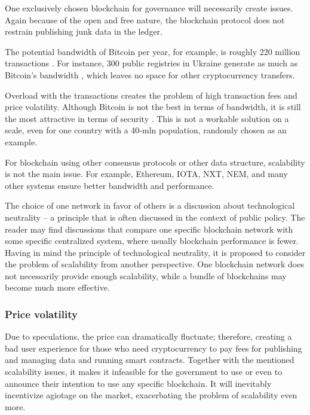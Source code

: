 \begin{multicols}{2}
\vspace{-.4cm}

One exclusively chosen blockchain for governance will necessarily create issues. Again because of the open and free nature, the blockchain protocol does not restrain publishing junk data in the ledger.

The potential bandwidth of Bitcoin per year, for example, is roughly 220 million transactions \cite{art1-key17}. For instance, 300 public registries in Ukraine generate as much as Bitcoin’s bandwidth \cite{art1-key18}, which leaves no space for other cryptocurrency transfers.

Overload with the transactions creates the problem of high transaction fees and price volatility. Although Bitcoin is not the best in terms of bandwidth, it is still the most attractive in terms of security \cite{art1-key19}. This is not a workable solution on a scale, even for one country with a 40-mln population, randomly chosen as an example.

For blockchain using other consensus protocols or other data structure, scalability is not the main issue. For example, Ethereum, IOTA, NXT, NEM, and many other systems ensure better bandwidth and performance.

The choice of one network in favor of others is a discussion about technological neutrality – a principle that is often discussed in the context of public policy. The reader may find discussions that compare one specific blockchain network with some specific centralized system, where usually blockchain performance is fewer. Having in mind the principle of technological neutrality, it is proposed to consider the problem of scalability from another perspective. One blockchain network does not necessarily provide enough scalability, while a bundle of blockchains may become much more effective.

\vspace{-.7cm}

\subsubsection{Price volatility}\label{subsubsec-03.1.6}

\vspace{-.4cm}

Due to speculations, the price can dramatically fluctuate; therefore, creating a bad user experience for those who need cryptocurrency to pay fees for publishing and managing data and running smart contracts. Together with the mentioned scalability issues, it makes it infeasible for the government to use or even to announce their intention to use any specific blockchain. It will inevitably incentivize agiotage on the market, exacerbating the problem of scalability even more.


\end{multicols}
